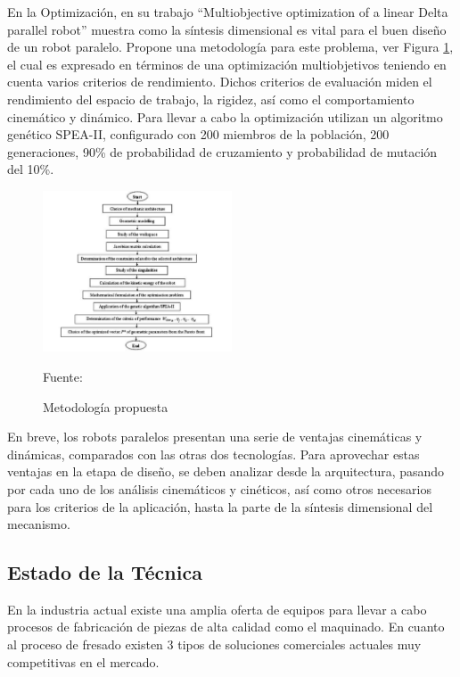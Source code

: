 En la Optimización, \cite{kelaiaia2012multiobjective} en su trabajo \enquote{Multiobjective optimization of a linear Delta parallel robot} muestra como la síntesis dimensional es vital para el buen diseño de un robot paralelo. Propone una metodología para este problema, ver Figura \ref{fig:Kelaiaia2012}, el cual es expresado en términos de una optimización multiobjetivos teniendo en cuenta varios criterios de rendimiento. Dichos criterios de evaluación miden el rendimiento del espacio de trabajo, la rigidez, así como el comportamiento cinemático y dinámico. Para llevar a cabo la optimización utilizan un algoritmo genético SPEA-II, configurado con 200 miembros de la población, 200 generaciones, 90\% de probabilidad de cruzamiento y probabilidad de mutación del 10\%.

\begin{figure}[hbt!]
    \centering
    \includegraphics[width=0.5\textwidth]{Cap2_DisenoEspecificaciones/Figura/Kelaiaia2012.pdf}
    \caption{Metodología propuesta}{Fuente: \citep{kelaiaia2012multiobjective}}
    \label{fig:Kelaiaia2012}
\end{figure}

En breve, los robots paralelos presentan una serie de ventajas cinemáticas y dinámicas, comparados con las otras dos tecnologías. Para aprovechar estas ventajas en la etapa de diseño, se deben analizar desde la arquitectura, pasando por cada uno de los análisis cinemáticos y cinéticos, así como otros necesarios para los criterios de la aplicación, hasta la parte de la síntesis dimensional del mecanismo.



\subsection{Estado de la Técnica}

En la industria actual existe una amplia oferta de equipos para llevar a cabo procesos de fabricación de piezas de alta calidad como el maquinado. En cuanto al proceso de fresado existen 3 tipos de soluciones comerciales actuales muy competitivas en el mercado.

